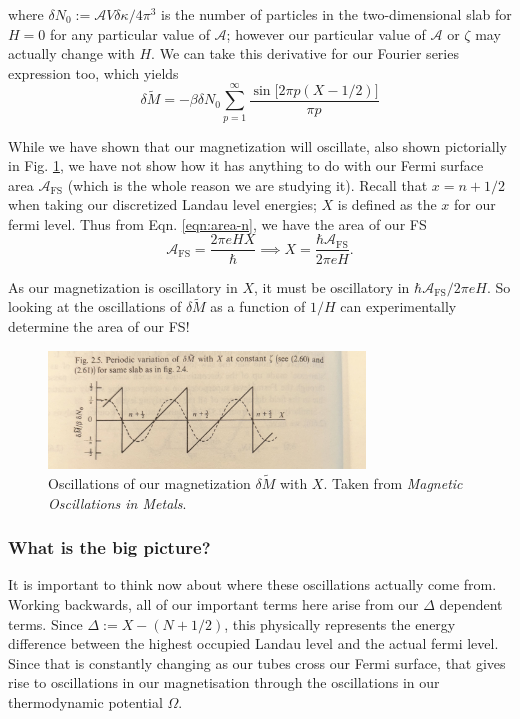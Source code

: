 \documentclass[12pt]{revtex4-2}
\begin{document}
where $\delta N_0 := \mathcal{A}V\delta\kappa/4\pi^3$ is the number of particles in the two-dimensional slab for $H=0$ for any particular value of $\mathcal{A}$; however our particular value of $\mathcal{A}$ or $\zeta$ may actually change with $H$.  We can take this derivative for our Fourier series expression too, which yields
\begin{equation}
    \boxed{ \delta \tilde{M} = -\beta \delta N_0 \sum_{p=1}^\infty \frac{\sin\big[ 2\pi  p(X - 1/2) \big]}{\pi p} }
\end{equation}

While we have shown that our magnetization will oscillate, also shown pictorially in Fig. \ref{fig:oscillations-mag}, we have not show how it has anything to do with our Fermi surface area $\mathcal{A}_\text{FS}$ (which is the whole reason we are studying it).  Recall that $x = n + 1/2$ when taking our discretized Landau level energies; $X$ is defined as the $x$ for our fermi level.  Thus from Eqn. \ref{eqn:area-n}, we have the area of our FS 
\begin{equation}
    \mathcal{A}_\text{FS} = \frac{2\pi eH X}{\hbar} \implies X = \frac{\hbar \mathcal{A}_\text{FS}}{2\pi eH}.
\end{equation}

As our magnetization is oscillatory in $X$, it must be oscillatory in $\hbar\mathcal{A}_\text{FS}/2\pi eH$.  So looking at the oscillations of $\delta \tilde{M}$ as a function of $1/H$ can experimentally determine the area of our FS!

\begin{figure}[tb]
\centering
\includegraphics[width=0.75\textwidth]{figures/oscillations_magnetization.jpg}
\caption{Oscillations of our magnetization $\delta \tilde{M}$ with $X$.  Taken from \textit{Magnetic Oscillations in Metals}.}
\label{fig:oscillations-mag}
\end{figure}

\subsubsection*{What is the big picture?}
It is important to think now about where these oscillations actually come from.  Working backwards, all of our important terms here arise from our $\Delta$ dependent terms.  Since $\Delta := X - (N + 1/2)$, this physically represents the energy difference between the highest occupied Landau level and the actual fermi level.  Since that is constantly changing as our tubes cross our Fermi surface, that gives rise to oscillations in our magnetisation through the oscillations in our thermodynamic potential $\Omega$.  
\end{document}
